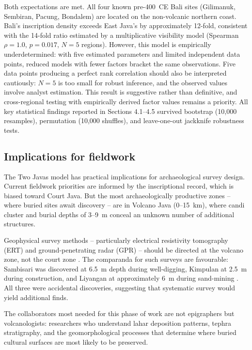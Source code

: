 \documentclass[12pt]{article}
\begin{document}
Both expectations are met.
All four known pre-400~CE Bali sites (Gilimanuk, Sembiran, Pacung, Bondalem) are located on the non-volcanic northern coast.
Bali's inscription density exceeds East Java's by approximately 12-fold, consistent with the 14-fold ratio estimated by a multiplicative visibility model (Spearman $\rho = 1.0$, $p = 0.017$, $N = 5$ regions).
However, this model is empirically underdetermined: with five estimated parameters and limited independent data points, reduced models with fewer factors bracket the same observations.
Five data points producing a perfect rank correlation should also be interpreted cautiously: $N = 5$ is too small for robust inference, and the observed values involve analyst estimation.
This result is suggestive rather than definitive, and cross-regional testing with empirically derived factor values remains a priority.
All key statistical findings reported in Sections 4.1--4.5 survived bootstrap (10,000 resamples), permutation (10,000 shuffles), and leave-one-out jackknife robustness tests.

\subsection{Implications for fieldwork}

The Two Javas model has practical implications for archaeological survey design.
Current fieldwork priorities are informed by the inscriptional record, which is biased toward Court Java.
But the most archaeologically productive zones -- where buried sites await discovery -- are in Volcano Java (0--15~km), where candi cluster and burial depths of 3--9~m conceal an unknown number of additional structures.

Geophysical survey methods -- particularly electrical resistivity tomography (ERT) and ground-penetrating radar (GPR) -- should be directed at the volcano zone, not the court zone \citep{Conyers2004}.
The comparanda for such surveys are favourable: Sambisari was discovered at 6.5~m depth during well-digging, Kimpulan at 2.5~m during construction, and Liyangan at approximately 6~m during sand-mining \citep{Putra2019, Abbas2016}.
All three were accidental discoveries, suggesting that systematic survey would yield additional finds.

The collaborators most needed for this phase of work are not epigraphers but volcanologists: researchers who understand lahar deposition patterns, tephra stratigraphy, and the geomorphological processes that determine where buried cultural surfaces are most likely to be preserved.
\end{document}
